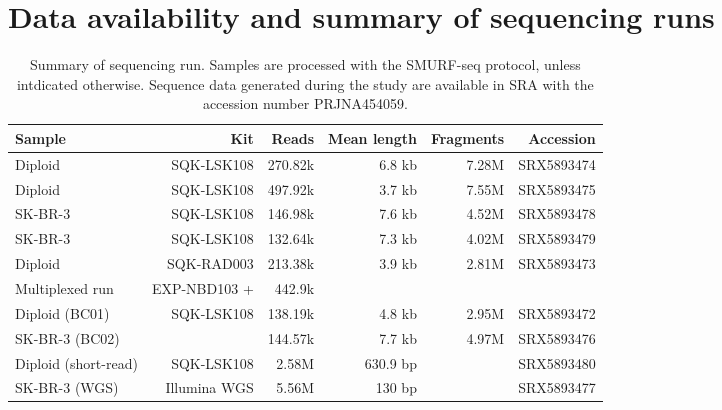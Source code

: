 \chapter{Data availability and summary of sequencing runs}
\label{appendB}

\begin{table}[H]
  \centering
  \begin{tabular*}{\columnwidth}{@{\extracolsep{\fill}}lrrrrr}
    \hline
    Sample & Kit & Reads & Mean length & Fragments & Accession \\
    \hline
    Diploid & SQK-LSK108 & 270.82k & 6.8 kb & 7.28M & SRX5893474 \\
    Diploid & SQK-LSK108 & 497.92k & 3.7 kb & 7.55M & SRX5893475 \\
    SK-BR-3 & SQK-LSK108 & 146.98k & 7.6 kb & 4.52M & SRX5893478 \\
    SK-BR-3 & SQK-LSK108 & 132.64k & 7.3 kb & 4.02M & SRX5893479 \\
    \hline
    Diploid & SQK-RAD003 & 213.38k & 3.9 kb & 2.81M & SRX5893473 \\
    \hline
    Multiplexed run & EXP-NBD103 + & 442.9k & & &  \\
    Diploid (BC01) & SQK-LSK108 & 138.19k & 4.8 kb & 2.95M & SRX5893472 \\
    SK-BR-3 (BC02) &  & 144.57k & 7.7 kb & 4.97M & SRX5893476 \\
    \hline
    \hline
    Diploid (short-read) & SQK-LSK108 & 2.58M & 630.9 bp & & SRX5893480 \\
    \hline
    \hline
    SK-BR-3 (WGS) & Illumina WGS & 5.56M & 130 bp & &  SRX5893477 \\
    \hline
  \end{tabular*}
  \caption{Summary of sequencing run. Samples are processed with the
    SMURF-seq protocol, unless intdicated otherwise. Sequence data
    generated during the study are available in SRA with the accession
    number PRJNA454059.}
  \label{seq-summary}
\end{table}
